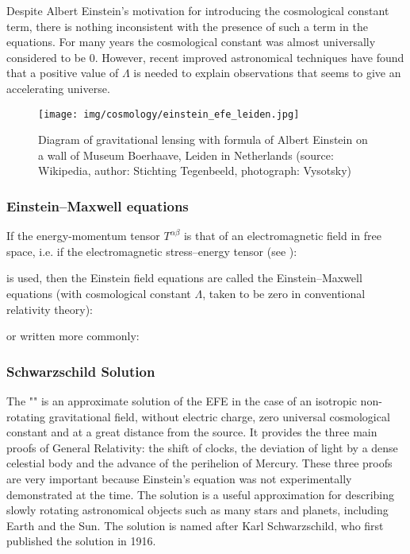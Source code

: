 		Despite Albert Einstein's motivation for introducing the cosmological constant term, there is nothing inconsistent with the presence of such a term in the equations. For many years the cosmological constant was almost universally considered to be $0$. However, recent improved astronomical techniques have found that a positive value of $\Lambda$  is needed to explain observations that seems to give an accelerating universe.	
	\begin{figure}[H]
		\centering
		\texttt{[image: img/cosmology/einstein\_efe\_leiden.jpg]}	
		\caption[]{Diagram of gravitational lensing  with formula of Albert Einstein on a wall of Museum Boerhaave, Leiden in Netherlands (source: Wikipedia, author: Stichting Tegenbeeld,  photograph: Vysotsky)}
	\end{figure}
	
	\pagebreak
	\subsubsection{Einstein–Maxwell equations}
	If the energy-momentum tensor $T^{\alpha\beta}$ is that of an electromagnetic field in free space, i.e. if the electromagnetic stress–energy tensor (see \pageref{electromagnetic stress energy tensor}):
	
	is used, then the Einstein field equations are called the Einstein–Maxwell equations (with cosmological constant $\Lambda$, taken to be zero in conventional relativity theory):
	
	or written more commonly:
	
	
	\pagebreak
	\subsubsection{Schwarzschild Solution}
	The "" is an approximate solution of the EFE  in the case of an isotropic non-rotating gravitational field, without electric charge, zero universal cosmological constant  and at a great distance from the source. It provides the three main proofs of General Relativity: the shift of clocks, the deviation of light by a dense celestial body and the advance of the perihelion of Mercury. These three proofs are very important because Einstein's equation was not experimentally demonstrated at the time.  The solution is a useful approximation for describing slowly rotating astronomical objects such as many stars and planets, including Earth and the Sun. The solution is named after Karl Schwarzschild, who first published the solution in 1916.

